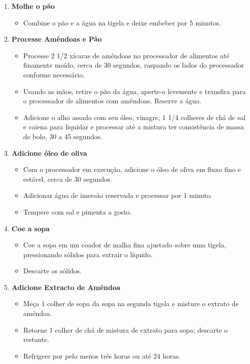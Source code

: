 \documentclass [11pt, letterpaper] {article}
\begin{document}
\begin {description}
\begin {enumerate}
\item {\bf Molhe o pão}
\begin {itemize}
\item Combine o pão e a água na tigela e deixe embeber por 5 minutos.
\end {itemize}

\item {\bf Processe Amêndoas e Pão}
\begin {itemize}
\item Processe 2 1/2 xícaras de amêndoas no processador de alimentos até finamente moído, cerca de 30 segundos, raspando os lados do processador conforme necessário.
\item Usando as mãos, retire o pão da água, aperte-o levemente e transfira para o processador de alimentos com amêndoas. Reserve a água.
\item Adicione o alho assado com seu óleo, vinagre, 1 1/4 colheres de chá de sal e caiena para liquidar e processar até a mistura ter consistência de massa de bolo, 30 a 45 segundos.
\end {itemize}


\item {\bf Adicione óleo de oliva}
\begin {itemize}
\item Com o processador em execução, adicione o óleo de oliva em fluxo fino e estável, cerca de 30 segundos.
\item Adicionar água de imersão reservada e processar por 1 minuto.
\item Tempere com sal e pimenta a gosto.
\end {itemize}

\item {\bf Coe a sopa}
\begin {itemize}
\item Coe a sopa em um coador de malha fina ajustado sobre uma tigela, pressionando sólidos para extrair o líquido.
\item Descarte os sólidos.
\end {itemize}

\item {\bf Adicione Extracto de Amêndoa}
\begin {itemize}
\item Me\c{c}a 1 colher de sopa da sopa na segunda tigela e misture o extrato de amêndoa.
\item Retorne 1 colher de chá de mistura de extrato para sopa; descarte o restante.
\item Refrigere por pelo menos tr\^es horas ou até 24 horas.
\end {itemize}


\end{enumerate}
\end{description}
\end{document}
